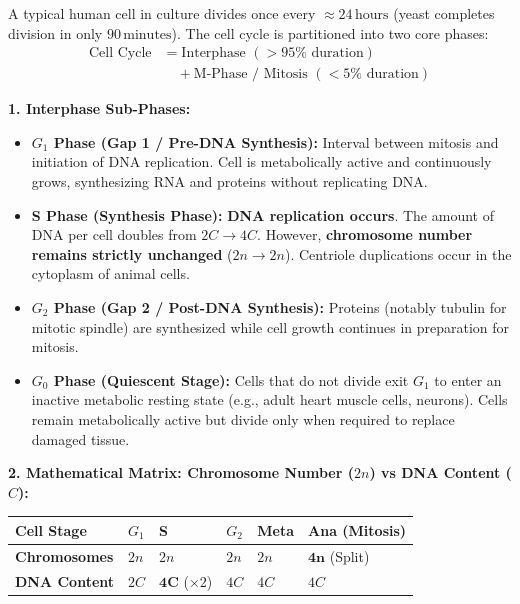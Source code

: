 \documentclass[10pt,twoside,openright]{book}
\begin{document}
\begin{formulabox}
A typical human cell in culture divides once every $\approx 24\,\mathrm{hours}$ (yeast completes division in only $90\,\mathrm{minutes}$). The cell cycle is partitioned into two core phases:
\begin{align*}
  \text{Cell Cycle} &= \text{Interphase } (>95\% \text{ duration}) \\
                    &\quad + \text{M-Phase / Mitosis } (<5\% \text{ duration})
\end{align*}

\textbf{1. Interphase Sub-Phases:}
\begin{itemize}
  \item \textbf{$G_1$ Phase (Gap 1 / Pre-DNA Synthesis):} Interval between mitosis and initiation of DNA replication. Cell is metabolically active and continuously grows, synthesizing RNA and proteins without replicating DNA.
  \item \textbf{S Phase (Synthesis Phase):} \textbf{DNA replication occurs}. The amount of DNA per cell doubles from $2C \to 4C$. However, \textbf{chromosome number remains strictly unchanged} ($2n \to 2n$). Centriole duplications occur in the cytoplasm of animal cells.
  \item \textbf{$G_2$ Phase (Gap 2 / Post-DNA Synthesis):} Proteins (notably tubulin for mitotic spindle) are synthesized while cell growth continues in preparation for mitosis.
  \item \textbf{$G_0$ Phase (Quiescent Stage):} Cells that do not divide exit $G_1$ to enter an inactive metabolic resting state (e.g., adult heart muscle cells, neurons). Cells remain metabolically active but divide only when required to replace damaged tissue.
\end{itemize}

\textbf{2. Mathematical Matrix: Chromosome Number ($2n$) vs DNA Content ($C$):}
\begin{center}
\footnotesize
\setlength{\tabcolsep}{2.5pt}
\renewcommand{\arraystretch}{1.2}
\begin{tabularx}{\linewidth}{|l|Y|Y|Y|Y|Y|}
\hline
\textbf{Cell Stage} & \textbf{$G_1$} & \textbf{S} & \textbf{$G_2$} & \textbf{Meta} & \textbf{Ana (Mitosis)} \\
\hline
\textbf{Chromosomes} & $2n$ & $2n$ & $2n$ & $2n$ & $\mathbf{4n}$ (Split) \\
\textbf{DNA Content} & $2C$ & $\mathbf{4C}$ ($\times 2$) & $4C$ & $4C$ & $4C$ \\
\hline
\end{tabularx}
\end{center}
\end{formulabox}
\end{document}
